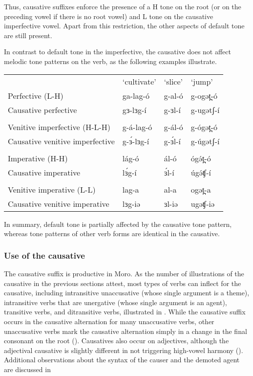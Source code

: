 Thus, causative suffixes enforce the presence of a H tone on the root (or on the preceding vowel if there is no root vowel) and L tone on the causative imperfective vowel.  Apart from this restriction, the other aspects of default tone are still present.

In contrast to default tone in the imperfective, the causative does not affect melodic tone patterns on the verb, as the following examples illustrate. 

\ea
\begin{tabular}[t]{llll}
& `cultivate' & `slice' & `jump' \\
Perfective (L-H) 			&	ga-lag-ó	&	g-al-ó	&	g-ogət̪-ó	\\
Causative perfective &	gɜ-lɜg-í	&	g-ɜl-í	&	g-ugətʃ-í\\
& \\
Venitive imperfective (H-L-H)  &	g-á-lag-ó	&	g-ál-ó	&	g-ógət̪-ó\\
Causative venitive imperfective	&	g-ɜ́-lɜg-í	&	g-ɜ́l-í	&	g-úgətʃ-í\\
& \\
Imperative (H-H)	&	lág-ó		&	ál-ó		&	ógə́t̪-ó \\
Causative imperative		&	lɜ́g-í		&	ɜ́l-í	&	úgə́ʧ-í\\
& \\
Venitive imperative (L-L)		&	lag-a		&	al-a		&	ogət̪-a \\
Causative venitive imperative	&	lɜg-iə		&	ɜl-iə	&	ugəʧ-iə\\
\end{tabular}
\z 

In summary, default tone is partially affected by the causative tone pattern, whereas tone patterns of other verb forms are identical in the causative. 


\subsubsection{Use of the causative}\label{sec:ch11:caususe}

The causative suffix is productive in Moro. As the number of illustrations of the causative in the previous sections attest, most types of verbs can inflect for the causative, including intransitive unaccusative (whose single argument is a theme), intransitive verbs that are unergative (whose single argument is an agent), transitive verbs, and ditransitive verbs, illustrated in . While the causative suffix occurs in the causative alternation for many unaccusative verbs, other unaccusative verbs mark the causative alternation simply in a change in the final consonant on the root ().  Causatives also occur on adjectives, although the adjectival causative is slightly different in not triggering high-vowel harmony (). Additional observations about the syntax of the causer and the demoted agent are discussed in 


